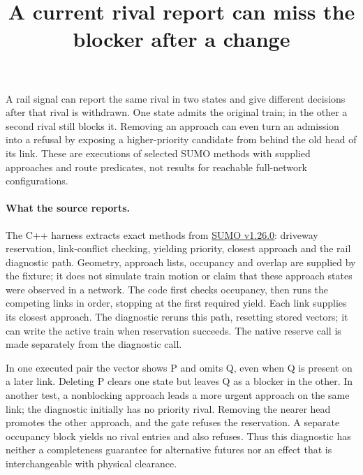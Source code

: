 \documentclass[11pt]{article}
\title{A current rival report can miss the blocker after a change}
\author{}
\date{}
\begin{document}
\maketitle

A rail signal can report the same rival in two states and give different decisions after that rival is withdrawn. One state admits the original train; in the other a second rival still blocks it. Removing an approach can even turn an admission into a refusal by exposing a higher-priority candidate from behind the old head of its link. These are executions of selected SUMO methods with supplied approaches and route predicates, not results for reachable full-network configurations.

\paragraph{What the source reports.}
The C++ harness extracts exact methods from \href{https://github.com/eclipse-sumo/sumo/tree/fa7df22d7f1c4ae245192ecc32410a49f1ffb2a3}{SUMO v1.26.0}: driveway reservation, link-conflict checking, yielding priority, closest approach and the rail diagnostic path. Geometry, approach lists, occupancy and overlap are supplied by the fixture; it does not simulate train motion or claim that these approach states were observed in a network. The code first checks occupancy, then runs the competing links in order, stopping at the first required yield. Each link supplies its closest approach. The diagnostic reruns this path, resetting stored vectors; it can write the active train when reservation succeeds. The native reserve call is made separately from the diagnostic call.

In one executed pair the vector shows P and omits Q, even when Q is present on a later link. Deleting P clears one state but leaves Q as a blocker in the other. In another test, a nonblocking approach leads a more urgent approach on the same link; the diagnostic initially has no priority rival. Removing the nearer head promotes the other approach, and the gate refuses the reservation. A separate occupancy block yields no rival entries and also refuses. Thus this diagnostic has neither a completeness guarantee for alternative futures nor an effect that is interchangeable with physical clearance.
\end{document}
